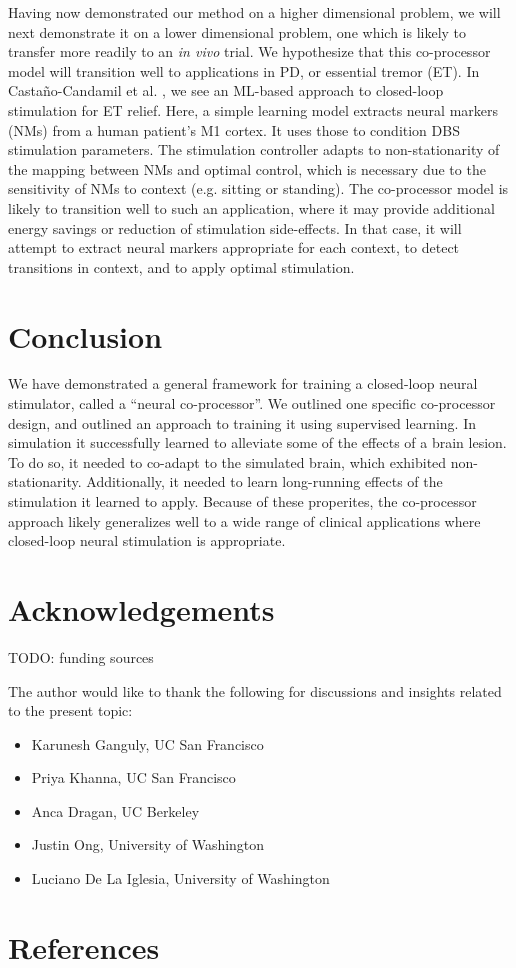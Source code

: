 \documentclass[12pt]{iopart}
\begin{document}
Having now demonstrated our method on a higher dimensional problem, we will next demonstrate
it on a lower dimensional problem, one which is likely to transfer more readily to
an \textit{in vivo} trial. We hypothesize that this co-processor model will transition well
to applications in PD, or essential tremor (ET). In Castaño-Candamil et al. \cite{castano.pd},
we see an ML-based approach to closed-loop stimulation for ET relief. Here, a simple learning
model extracts neural markers (NMs) from a human patient's M1 cortex. It uses those to
condition DBS stimulation parameters. The stimulation controller adapts to non-stationarity
of the mapping between NMs and optimal control, which is necessary due to the sensitivity
of NMs to context (e.g. sitting or standing). The co-processor model is likely to
transition well to such an application, where it may provide additional energy savings
or reduction of stimulation side-effects. In that case, it will attempt to extract neural
markers appropriate for each context, to detect transitions in context, and to apply
optimal stimulation.

\section{Conclusion}
We have demonstrated a general framework for training a closed-loop neural stimulator,
called a ``neural co-processor''. We outlined one specific co-processor design, and
outlined an approach to training it using supervised learning. In simulation it
successfully learned to alleviate some of the effects of a brain lesion. To do so, it
needed to co-adapt to the simulated brain, which exhibited non-stationarity. Additionally,
it needed to learn long-running effects of the stimulation it learned to apply. Because of
these properites, the co-processor approach likely generalizes well to a wide range of
clinical applications where closed-loop neural stimulation is appropriate.

\section{Acknowledgements}
TODO: funding sources

The author would like to thank the following for discussions and insights related to
the present topic:
\begin{itemize}
	\item Karunesh Ganguly, UC San Francisco
	\item Priya Khanna, UC San Francisco
	\item Anca Dragan, UC Berkeley
	\item Justin Ong, University of Washington
	\item Luciano De La Iglesia, University of Washington
\end{itemize}

\section{References}


\end{document}
